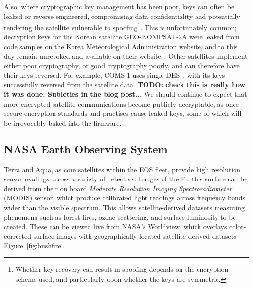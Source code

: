 Also, where cryptographic key management has been poor, keys can often be leaked or reverse engineered, compromising data confidentiality and potentially rendering the satellite vulnerable to spoofing\footnote{Whether key recovery can result in spoofing depends on the encryption scheme used, and particularly upon whether the keys are symmetric.}.
This is unfortunately common; decryption keys for the Korean satellite GEO-KOMPSAT-2A were leaked from code samples on the Korea Meteorological Administration website, and to this day remain unrevoked and available on their website~\cite{xrit-rx}.
Other satellites implement either poor cryptography, or good cryptography poorly, and can therefore have their keys reversed.
For example, COMS-1 uses single DES~\cite{lrit-key-dec}, with its keys successfully reversed from the satellite data. \textbf{TODO: check this is really how it was done. Subleties in the blog post...}
We should continue to expect that more encrypted satellite communications become publicly decryptable, as once-secure encryption standards and practises cause leaked keys, some of which will be irrevocably baked into the firmware.


\subsection{NASA Earth Observing System}


Terra and Aqua, as core satellites within the EOS fleet, provide high resolution sensor readings across a variety of detectors.
Images of the Earth's surface can be derived from their on board \textit{Moderate Resolution Imaging Spectroradiometer} (MODIS) sensor, which produce calibrated light readings across frequency bands wider than the visible spectrum.
This allows satellite-derived datasets measuring phenomena such as forest fires, ozone scattering, and surface luminosity to be created.
These can be viewed live from NASA's Worldview, which overlays color-corrected surface images with geographically located satellite derived datasets Figure~\ref{fig:bushfire}.


